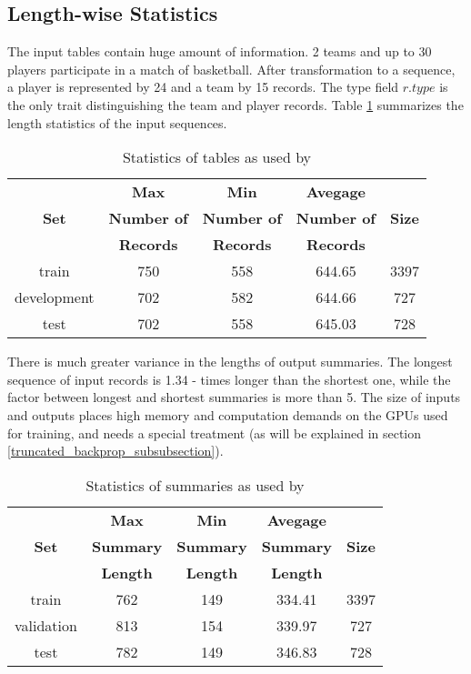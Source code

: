 \subsection{Length-wise Statistics}

The input tables contain huge amount of information. 2 teams and up to 30 players participate in a match of basketball. After transformation to a sequence, a player is represented by 24 and a team by 15 records. The type field $r.type$ is the only trait distinguishing the team and player records. Table \ref{stats_tables_orig_rw} summarizes the length statistics of the input sequences. 

\begin{table}[h!]
    \centering
    \begin{tabular}{ccccc}
        \toprule
        {}    & \textbf{Max} & \textbf{Min} & \textbf{Avegage}& {} \\
        \textbf{Set} & \textbf{Number of} & \textbf{Number of} & \textbf{Number of} & \textbf{Size} \\
        {} & \textbf{Records} & \textbf{Records} & \textbf{Records} & {} \\
        \midrule
        train       & 750 & 558 & 644.65 & 3397  \\
        development & 702 & 582 & 644.66 & 727 \\
        test        & 702 & 558 & 645.03 & 728
    \end{tabular}
    \caption{Statistics of tables as used by \citep{wiseman2017}} \label{stats_tables_orig_rw}
\end{table}

There is much greater variance in the lengths of output summaries. The longest sequence of input records is 1.34 - times longer than the shortest one, while the factor between longest and shortest summaries is more than 5. The size of inputs and outputs places high memory and computation demands on the GPUs used for training, and needs a special treatment (as will be explained in section \ref{truncated_backprop_subsubsection}).

\begin{table}[h!]
    \centering
    \begin{tabular}{ccccc}
        \toprule
        {}    & \textbf{Max} & \textbf{Min} & \textbf{Avegage}& {} \\
        \textbf{Set} & \textbf{Summary} & \textbf{Summary} & \textbf{Summary} & \textbf{Size} \\
        {} & \textbf{Length} & \textbf{Length} & \textbf{Length} & {} \\
        \midrule
        train      & 762 & 149 & 334.41 & 3397  \\
        validation & 813 & 154 & 339.97 & 727 \\
        test       & 782 & 149 & 346.83 & 728
    \end{tabular}
    \caption{Statistics of summaries as used by \citep{wiseman2017}} \label{stats_sums_orig_rw}
\end{table}


